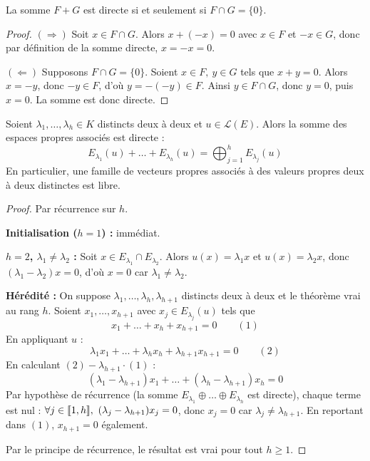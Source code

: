 \begin{prop}
\label{prop:somme-directe-deux}
La somme $F+G$ est directe si et seulement si $F\cap G = \{0\}$.
\end{prop}

\begin{proof}
$(\Rightarrow)$ Soit $x\in F\cap G$. Alors $x+(-x)=0$ avec $x\in F$ et $-x\in G$, donc par définition de la somme directe, $x=-x=0$.

$(\Leftarrow)$ Supposons $F\cap G=\{0\}$. Soient $x\in F,\ y\in G$ tels que $x+y=0$. Alors $x=-y$, donc $-y\in F$, d'où $y=-(-y)\in F$. Ainsi $y\in F\cap G$, donc $y=0$, puis $x=0$. La somme est donc directe.
\end{proof}

\begin{prop}
\label{prop:somme-directe-espaces-propres}
Soient $\lambda_1,\dots,\lambda_h\in K$ distincts deux à deux et $u\in\mathcal{L}(E)$. Alors la somme des espaces propres associés est directe :
\[E_{\lambda_1}(u)+\dots+E_{\lambda_h}(u) = \bigoplus_{j=1}^{h} E_{\lambda_j}(u)\]
En particulier, une famille de vecteurs propres associés à des valeurs propres deux à deux distinctes est libre.
\end{prop}

\begin{proof}
Par récurrence sur $h$.

\textbf{Initialisation ($h=1$) :} immédiat.

\textbf{$h=2$, $\lambda_1\neq\lambda_2$ :} Soit $x\in E_{\lambda_1}\cap E_{\lambda_2}$. Alors $u(x)=\lambda_1 x$ et $u(x)=\lambda_2 x$, donc $(\lambda_1-\lambda_2)x=0$, d'où $x=0$ car $\lambda_1\neq\lambda_2$.

\textbf{Hérédité :} On suppose $\lambda_1,\dots,\lambda_h,\lambda_{h+1}$ distincts deux à deux et le théorème vrai au rang $h$. Soient $x_1,\dots,x_{h+1}$ avec $x_j\in E_{\lambda_j}(u)$ tels que
\[x_1+\dots+x_h+x_{h+1}=0 \qquad (1)\]
En appliquant $u$ :
\[\lambda_1 x_1+\dots+\lambda_h x_h+\lambda_{h+1}x_{h+1}=0 \qquad (2)\]
En calculant $(2)-\lambda_{h+1}\cdot(1)$ :
\[(\lambda_1-\lambda_{h+1})x_1+\dots+(\lambda_h-\lambda_{h+1})x_h = 0\]
Par hypothèse de récurrence (la somme $E_{\lambda_1}\oplus\dots\oplus E_{\lambda_h}$ est directe), chaque terme est nul : $\forall j\in\llbracket 1,h \rrbracket,\ (\lambda_j-\lambda_{h+1})x_j=0$, donc $x_j=0$ car $\lambda_j\neq\lambda_{h+1}$. En reportant dans $(1)$, $x_{h+1}=0$ également.

Par le principe de récurrence, le résultat est vrai pour tout $h\geq 1$.
\end{proof}

